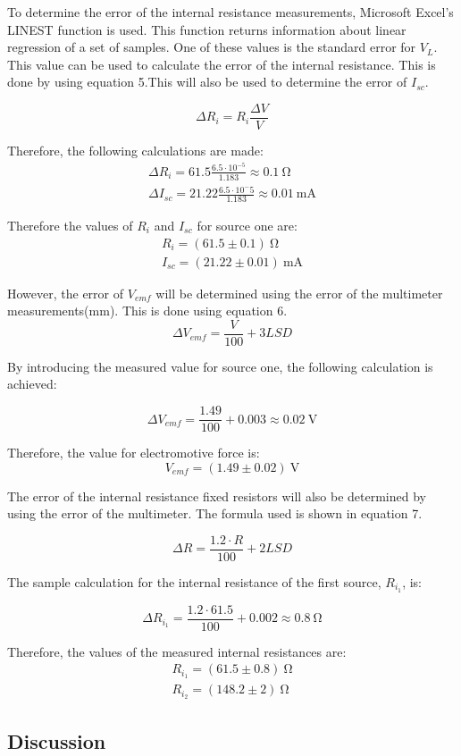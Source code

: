 \documentclass[a4paper]{article}
\newcommand{\unit}[1]{~\mathrm{#1}}
\begin{document}
To determine the error of the internal resistance measurements, Microsoft
Excel's LINEST function is used. This function returns information about linear
regression of a set of samples. One of these values is the standard error for
$V_{L}$. This value can be used to calculate the error of the internal
resistance. This is done by using equation 5.This will also be used to determine the error of $I_{sc}$. 

\begin{equation}
    \Delta R_i = R_i \frac{\Delta V}{V}
\end{equation}

Therefore, the following calculations are made:
\begin{gather*}
    \Delta R_i = 61.5 \frac{6.5 \cdot 10^{-5}}{1.183} \approx 0.1\unit{\Omega}\\
    \Delta I_{sc} = 21.22 \frac{6.5\cdot 10^-5}{1.183} \approx 0.01\unit{mA}
\end{gather*}

Therefore the values of $R_i$ and $I_{sc}$ for source one are:
\begin{gather*}
    R_i = (61.5\pm 0.1)\unit{\Omega}\\
    I_{sc} = (21.22 \pm 0.01)\unit{mA}
\end{gather*}

However, the error of $V_{emf}$ will be determined using the error of the
multimeter measurements(mm). This is done using equation 6.
\begin{equation}
    \Delta V_{emf} = \frac{V}{100} + 3 LSD
\end{equation}

By introducing the measured value for source one, the following calculation is
achieved:

\[ \Delta V_{emf} = \frac{1.49}{100} + 0.003 \approx 0.02 \unit{V}\]

Therefore, the value for electromotive force is:
\[V_{emf} = (1.49 \pm 0.02)\unit{V}\]

The error of the internal resistance fixed resistors will also be determined by
using the error of the multimeter. The formula used is shown in equation 7.

\begin{equation}
    \Delta R = \frac{1.2 \cdot R}{100} + 2LSD
\end{equation}

The sample calculation for the internal resistance of the first source, $R_{i_1}$, is:

\[\Delta R_{i_1} = \frac{1.2 \cdot 61.5}{100} + 0.002 \approx 0.8\unit{\Omega}\]

Therefore, the values of the measured internal resistances are:
\begin{gather*}
    R_{i_1} = (61.5 \pm 0.8)\unit{\Omega}\\
    R_{i_2} = (148.2 \pm 2)\unit{\Omega}
\end{gather*}

\subsection{Discussion}
\end{document}
